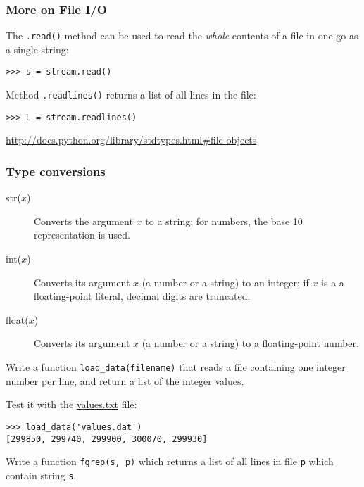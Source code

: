 \documentclass[english,serif,mathserif,xcolor=pdftex,dvipsnames,table]{beamer}
\begin{document}
\begin{frame}[fragile]
  \frametitle{More on File I/O}

  The \lstinline|.read()| method can be used to read the \emph{whole} contents
  of a file in one go as a single string:
\begin{lstlisting}
>>> s = stream.read()
\end{lstlisting}

  \+
  Method \lstinline|.readlines()| returns a list of all lines in the file:
\begin{lstlisting}
>>> L = stream.readlines()
\end{lstlisting}

  \begin{references}
    \url{http://docs.python.org/library/stdtypes.html#file-objects}
  \end{references}
\end{frame}


\begin{frame}[fragile,label=typeconv]
  \frametitle{Type conversions}
  \begin{description}
  \item[str($x$)] Converts the argument $x$ to a string; for numbers,
    the base 10 representation is used.
  \item[int($x$)] Converts its argument $x$ (a number or a string) to an integer;
    if $x$ is a a floating-point literal, decimal digits are truncated.
  \item[float($x$)] Converts its argument $x$ (a number or a string) to a
    floating-point number.
  \end{description}
\end{frame}


\begin{frame}[fragile]
  \begin{exercise*}[5.D]
    Write a function \lstinline|load_data(filename)| that reads a file
    containing one integer number per line, and return a list of the
    integer values.

    \+
    Test it with the
    \href{https://raw.github.com/gc3-uzh-ch/python-course/master/values.txt}{values.txt}
    file:
\begin{lstlisting}
>>> load_data('values.dat')
[299850, 299740, 299900, 300070, 299930]
\end{lstlisting}
  \end{exercise*}

  \begin{exercise*}[5.E]
    Write a function \lstinline|fgrep(s, p)| which returns a list of
    all lines in file \texttt{p} which contain string \texttt{s}.
  \end{exercise*}
\end{frame}
\end{document}
